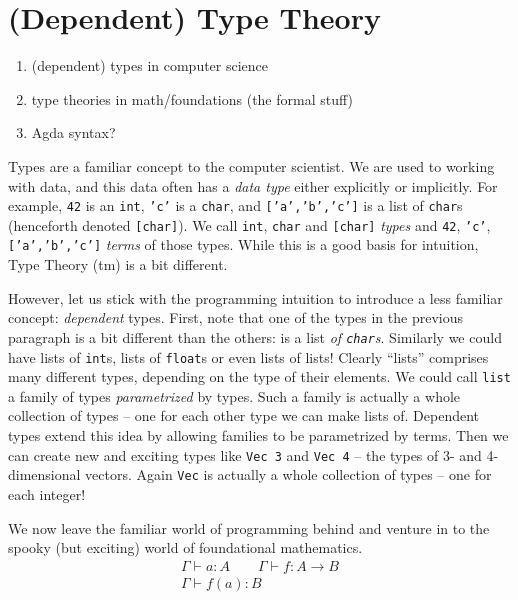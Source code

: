 \section{(Dependent) Type Theory}
\begin{enumerate}
  \item (dependent) types in computer science
  \item type theories in math/foundations (the formal stuff)
  \item Agda syntax?
\end{enumerate}

Types are a familiar concept to the computer scientist. We are used to working
with data, and this data often has a \emph{data type} either explicitly or
implicitly. For example, \texttt{42} is an \texttt{int}, \texttt{'c'} is a
\texttt{char}, and \texttt{['a','b','c']} is a list of \texttt{char}s (henceforth
denoted \texttt{[char]}). We call
\texttt{int}, \texttt{char} and \texttt{[char]} \emph{types} and
\texttt{42}, \texttt{'c'}, \texttt{['a','b','c']} \emph{terms} of those types.
While this is a good basis for intuition, Type Theory (tm) is a bit different.

However, let us stick with the programming intuition to introduce a less
familiar concept: \emph{dependent} types. First, note that one of the types in
the previous paragraph is a bit different than the others: \text{['a','b','c']} is a
list \emph{of \texttt{char}s}. Similarly we could have lists of \texttt{int}s,
lists of \texttt{float}s or even lists of lists! Clearly ``lists'' comprises
many different types, depending on the type of their elements. We could call
\texttt{list} a family of types \emph{parametrized} by types. Such a family is
actually a whole collection of types -- one for each other type we can make
lists of.
Dependent types extend this idea by allowing families to be parametrized by
terms. Then we can create new and exciting types like \texttt{Vec 3} and
\texttt{Vec 4} -- the types of 3- and 4-dimensional vectors. Again \texttt{Vec} is
actually a whole collection of types -- one for each integer!

We now leave the familiar world of programming behind and venture in to the spooky
(but exciting) world of foundational mathematics.
\begin{equation}
  \begin{array}{c}
    \Gamma \vdash a : A \qquad \Gamma \vdash f : A \rightarrow B\\
    \hline
    \Gamma \vdash f(a) : B
  \end{array}
  \label{rule:example}
\end{equation}

